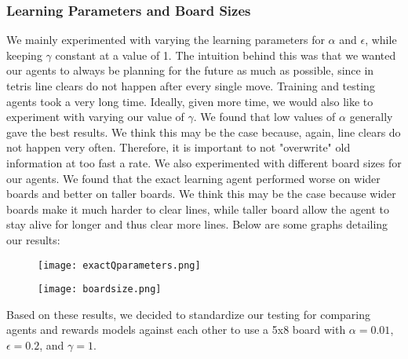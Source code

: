 \documentclass[11pt]{article}
\begin{document}
\subsubsection{Learning Parameters and Board Sizes}
We mainly experimented with varying the learning parameters for $\alpha$ and $\epsilon$, while keeping $\gamma$ constant at a value of 1. The intuition behind this was that we wanted our agents to always be planning for the future as much as possible, since in tetris line clears do not happen after every single move. Training and testing agents took a very long time. Ideally, given more time, we would also like to experiment with varying our value of $\gamma$. We found that low values of $\alpha$ generally gave the best results. We think this may be the case because, again, line clears do not happen very often. Therefore, it is important to not "overwrite" old information at too fast a rate. We also experimented with different board sizes for our agents. We found that the exact learning agent performed worse on wider boards and better on taller boards. We think this may be the case because wider boards make it much harder to clear lines, while taller board allow the agent to stay alive for longer and thus clear more lines. Below are some graphs detailing our results:
\begin{figure}[H]
  \centering
  \begin{minipage}[b]{0.4\textwidth}
    \texttt{[image: exactQparameters.png]}
  \end{minipage}
  \hfill
  \begin{minipage}[b]{0.4\textwidth}
    \texttt{[image: boardsize.png]}
  \end{minipage}
\end{figure}
Based on these results, we decided to standardize our testing for comparing agents and rewards models against each other to use a 5x8 board with $\alpha=0.01$, $\epsilon=0.2$, and $\gamma=1$.
\end{document}
